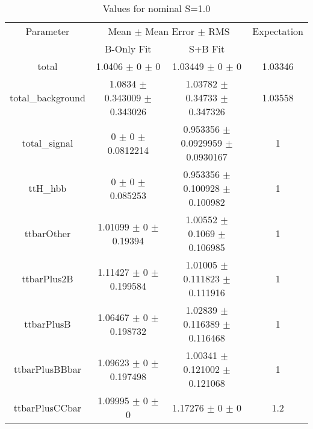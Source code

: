 \begin{table}
\centering
\caption{Values for nominal S=1.0}
\begin{tabular}{cccc}
\toprule
Parameter & \multicolumn{2}{c}{Mean $\pm$ Mean Error $\pm$ RMS} & Expectation\\
 & B-Only Fit & S+B Fit & \\
\midrule
total & \num{1.0406} $\pm$ \num{0} $\pm$ \num{0} & \num{1.03449} $\pm$ \num{0} $\pm$ \num{0} & \num{1.03346}\\
total\_background & \num{1.0834} $\pm$ \num{0.343009} $\pm$ \num{0.343026} & \num{1.03782} $\pm$ \num{0.34733} $\pm$ \num{0.347326} & \num{1.03558}\\
total\_signal & \num{0} $\pm$ \num{0} $\pm$ \num{0.0812214} & \num{0.953356} $\pm$ \num{0.0929959} $\pm$ \num{0.0930167} & \num{1}\\
ttH\_hbb & \num{0} $\pm$ \num{0} $\pm$ \num{0.085253} & \num{0.953356} $\pm$ \num{0.100928} $\pm$ \num{0.100982} & \num{1}\\
ttbarOther & \num{1.01099} $\pm$ \num{0} $\pm$ \num{0.19394} & \num{1.00552} $\pm$ \num{0.1069} $\pm$ \num{0.106985} & \num{1}\\
ttbarPlus2B & \num{1.11427} $\pm$ \num{0} $\pm$ \num{0.199584} & \num{1.01005} $\pm$ \num{0.111823} $\pm$ \num{0.111916} & \num{1}\\
ttbarPlusB & \num{1.06467} $\pm$ \num{0} $\pm$ \num{0.198732} & \num{1.02839} $\pm$ \num{0.116389} $\pm$ \num{0.116468} & \num{1}\\
ttbarPlusBBbar & \num{1.09623} $\pm$ \num{0} $\pm$ \num{0.197498} & \num{1.00341} $\pm$ \num{0.121002} $\pm$ \num{0.121068} & \num{1}\\
ttbarPlusCCbar & \num{1.09995} $\pm$ \num{0} $\pm$ \num{0} & \num{1.17276} $\pm$ \num{0} $\pm$ \num{0} & \num{1.2}\\
\bottomrule
\end{tabular}
\end{table}